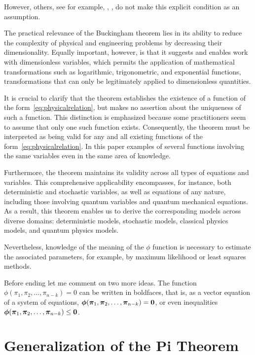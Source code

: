 \documentclass[
	11pt, %
	fleqn, %
	a4paper, %
]{LegrandOrangeBook}
\begin{document}
However, others, see for example, \cite{Boyling:79}, \cite{CurtisLP:82}, do not make this explicit condition as an assumption.

The practical relevance of the Buckingham theorem lies in its ability to reduce the complexity of physical and engineering problems by decreasing their dimensionality. Equally important, however, is that it suggests and enables work with dimensionless variables, which permits the application of mathematical transformations such as logarithmic, trigonometric, and exponential functions, transformations that can only be legitimately applied to dimensionless quantities.

It is crucial to clarify that the theorem establishes the existence of a function of the form~\eqref{eq:physicalrelation}, but makes no assertion about the uniqueness of such a function. This distinction is emphasized because some practitioners seem to assume that only one such function exists. Consequently, the theorem must be interpreted as being valid for any and all existing functions of the form~\eqref{eq:physicalrelation}. In this paper examples of several functions involving the same variables even in the same area of knowledge.

Furthermore, the theorem maintains its validity across all types of equations and variables. This comprehensive applicability encompasses, for instance, both deterministic and stochastic variables, as well as equations of any nature, including those involving quantum variables and quantum mechanical equations. As a result, this theorem enables us to derive the corresponding models across diverse domains: deterministic models, stochastic models, classical physics models, and quantum physics models.

Nevertheless, knowledge of the meaning of the $\phi$ function is necessary to estimate the associated parameters, for example, by maximum likelihood or least squares methods.

Before ending let me comment on two more ideas. The function $\phi(\pi_1,\pi_2,\ldots,\pi_{n-k}) = 0$ can be written in boldfaces, that is, as a vector equation of a system of equations,  ${\bm{\phi}}(\bm{\pi}_1,\bm{\pi}_2,\ldots,\bm{\pi}_{n-k}) = {\bf 0}$, or even inequalities ${\bm{\phi}}(\bm{\pi}_1,\bm{\pi}_2,\ldots,\bm{\pi}_{n-k}) \le {\bf 0}$.

\section{Generalization of the Pi Theorem}
\end{document}
